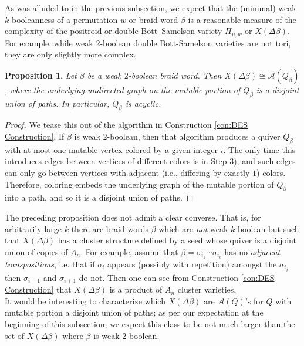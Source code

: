 \documentclass[11pt]{amsart}
\newtheorem{prop}[thm]{Proposition}
\theoremstyle{definition}
\theoremstyle{remark}
\numberwithin{equation}{section}
\begin{document}
As was alluded to in the previous subsection, we expect that the (minimal) weak $k$-booleanness of a permutation $w$ or braid word $\beta$ is a reasonable measure of the complexity of the positroid or double Bott--Samelson variety $\Pi_{u,w}$ or $X(\Delta \beta)$. For example, while weak 2-boolean double Bott-Samelson varieties are not tori, they are only slightly more complex.

\begin{prop}
    Let $\beta$ be a weak $2$-boolean braid word. Then $X(\Delta\beta) \cong \mathcal{A}(Q_\beta)$, where the underlying undirected graph on the mutable portion of $Q_\beta$ is a disjoint union of paths. In particular, $Q_\beta$ is acyclic.
\end{prop}

\begin{proof}
    We tease this out of the algorithm in Construction \ref{con:DES Construction}. If $\beta$ is weak $2$-boolean, then that algorithm produces a quiver $Q_\beta$ with at most one mutable vertex colored by a given integer $i$. The only time this introduces edges between vertices of different colors is in Step 3), and such edges can only go between vertices with adjacent (i.e., differing by exactly $1$) colors. Therefore, coloring embeds the underlying graph of the mutable portion of $Q_\beta$ into a path, and so it is a disjoint union of paths.
\end{proof}

The preceding proposition does not admit a clear converse. That is, for arbitrarily large $k$ there are braid words $\beta$ which are \textit{not} weak $k$-boolean but such that $X(\Delta \beta)$ has a cluster structure defined by a seed whose quiver is a disjoint union of copies of $A_n$. For example, assume that $\beta = \sigma_{i_1} \cdots \sigma_{i_\ell}$ has no \textit{adjacent transpositions}, i.e. that if $\sigma_i$ appears (possibly with repetition) amongst the $\sigma_{i_j}$ then $\sigma_{i-1}$ and $\sigma_{i+1}$ do not. Then one can see from Construction \ref{con:DES Construction} that $X(\Delta \beta)$ is a product of $A_n$ cluster varieties.\\

It would be interesting to characterize which $X(\Delta \beta)$ are $\mathcal{A}(Q)$'s for $Q$ with mutable portion a disjoint union of paths; as per our expectation at the beginning of this subsection, we expect this class to be not much larger than the set of $X(\Delta \beta)$ where $\beta$ is weak $2$-boolean.
\end{document}
